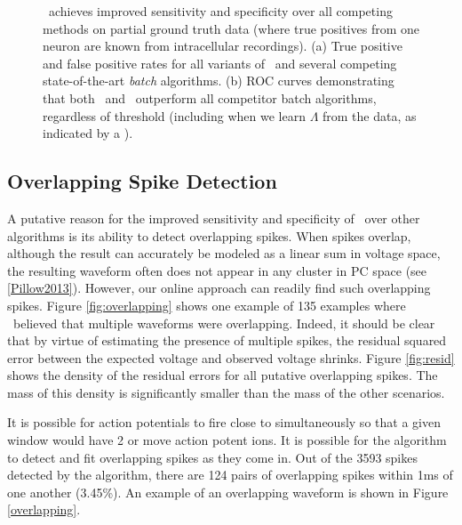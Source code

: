 \begin{center}
\begin{figure}
\begin{subfigure}[b]{.49\textwidth}
\caption{}
\label{fig:roc}
\end{subfigure}
\caption{\smug\ achieves improved sensitivity and specificity over all competing methods on partial ground truth data (where true positives from one neuron are known from intracellular recordings).  
(a) True positive and false positive rates for all variants of \smug\ and several competing state-of-the-art \emph{batch} algorithms.  
(b) ROC curves demonstrating that both \smug\ and \smug\ outperform all competitor batch algorithms, regardless of threshold (including when we learn $\Lambda$ from the data, as indicated by a \jovo{*}).
}
\end{figure}
\end{center}



\subsection{Overlapping Spike Detection}



A putative reason for the improved sensitivity and specificity of \smug\ over other algorithms is its ability to detect overlapping spikes.   When spikes overlap, although the result can accurately be modeled as a linear sum in voltage space, the resulting waveform often does not appear in any cluster in PC space (see \ref{Pillow2013}).  However, our online approach can readily find such overlapping spikes.  Figure \ref{fig:overlapping} shows one example of 135 examples where \smug\ believed that multiple waveforms were overlapping.  Indeed, it should be clear that by virtue of estimating the presence of multiple spikes, the residual squared error between the expected voltage and observed voltage shrinks.  Figure \ref{fig:resid} shows the density of the residual errors for all putative overlapping spikes.  The mass of this density is significantly smaller than the mass of the other scenarios.  


It is possible for action potentials to fire close to simultaneously so that a given window would have 2 or move action potent ions.  It is possible for the algorithm to detect and fit overlapping spikes as they come in.  Out of the 3593 spikes detected by the algorithm, there are 124 pairs of overlapping spikes within 1ms of one another (3.45\%).  An example of an overlapping waveform is shown in Figure \ref{overlapping}.

